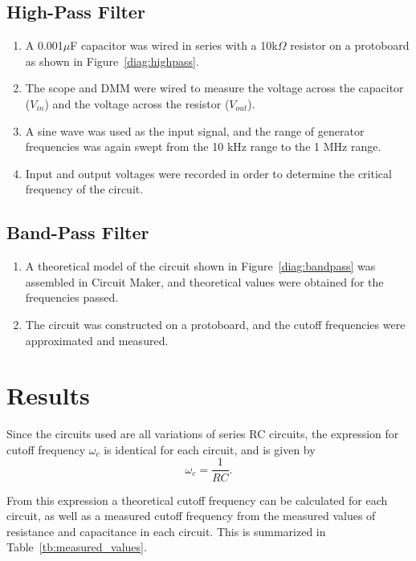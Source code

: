 \documentclass[twocolumn,english]{IEEEtran}
\theoremstyle{plain}
\theoremstyle{plain}
\begin{document}
	\subsection{High-Pass Filter}
	\begin{enumerate}
		\item A 0.001$\mu$F capacitor was wired in series with a 10k$\Omega$ resistor on a protoboard as shown in Figure~\ref{diag:highpass}.
		\item The scope and DMM were wired to measure the voltage across the capacitor ($V_{in}$) and the voltage across the resistor ($V_{out}$).
		\item A sine wave was used as the input signal, and the range of generator frequencies was again swept from the 10 kHz range to the 1 MHz range.
		\item Input and output voltages were recorded in order to determine the critical frequency of the circuit.
	\end{enumerate}

	\subsection{Band-Pass Filter}
	\begin{enumerate}
		\item A theoretical model of the circuit shown in Figure~\ref{diag:bandpass} was assembled in Circuit Maker, and theoretical values were obtained for the frequencies passed.
		\item The circuit was constructed on a protoboard, and the cutoff frequencies were approximated and measured.
	\end{enumerate}


\hrulefill

\section{Results}

Since the circuits used are all variations of series RC circuits, the expression for cutoff frequency $\omega_c$ is identical for each circuit, and is given by
\begin{equation}
	\omega_c = \frac{1}{RC}.
\end{equation}

From this expression a theoretical cutoff frequency can be calculated for each circuit, as well as a measured cutoff frequency from the measured values of resistance and capacitance in each circuit. This is summarized in Table~\ref{tb:measured_values}.
\end{document}
